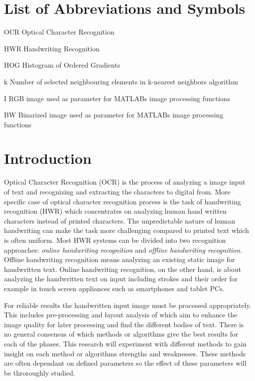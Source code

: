 \documentclass{article}
\begin{document}
   \section*{List of Abbreviations and Symbols}

   \begin{abbrv}
    \item[OCR] Optical Character Recognition
    \item[HWR] Handwriting Recognition
    \item[HOG] Histogram of Ordered Gradients
    \item[k] Number of selected neighbouring elements in k-nearest neighbors algorithm
    \item[I] RGB image used as parameter for MATLABs image processing functions
    \item[BW] Binarized image used as parameter for MATLABs image processing functions
   \end{abbrv}

   \newpage
   \section{Introduction}
    Optical Character Recognition (OCR) is the process of analyzing a image input of  text and recognizing and extracting the characters to digital from. More specific case of optical character recognition process is the task of handwriting recognition (HWR) which concentrates on analyzing human hand written characters instead of printed characters. The unpredictable nature of human handwriting can make the task more challenging compared to printed text which is often uniform. Most HWR systems can be divided into two recognition approaches: \textit{online handwriting recognition} and \textit{offline handwriting recognition}. Offline handwriting recognition means analyzing an existing static image for handwritten text. Online handwriting recognition, on the other hand, is about analyzing the handwritten text on input including strokes and their order for example in touch screen appliances such as smartphones and tablet PCs.

    For reliable results the handwritten input image must be processed appropriately. This includes pre-processing and layout analysis of which aim to enhance the image quality for later processing and find the different bodies of text. There is no general consensus of which methods or algorithms give the best results for each of the phases. This research will experiment with different methods to gain insight on each method or algorithms strengths and weaknesses. These methods are often dependant on defined parameters so the effect of these parameters will be throroughly studied.
\end{document}
